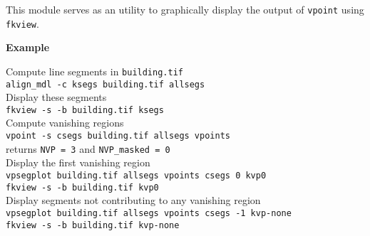 This module serves as an utility to graphically display the output of \verb+vpoint+ using \verb+fkview+.

{\large \bf Example}

\medskip

Compute line segments in \verb+building.tif+\\
\verb+align_mdl -c ksegs building.tif allsegs+\\
Display these segments\\
\verb+fkview -s -b building.tif ksegs+\\
Compute vanishing regions\\
\verb+vpoint -s csegs building.tif allsegs vpoints+\\
returns \verb+NVP = 3+ and \verb+NVP_masked = 0+\\
Display the first vanishing region\\
\verb+vpsegplot building.tif allsegs vpoints csegs 0 kvp0+\\
\verb+fkview -s -b building.tif kvp0+\\
Display segments not contributing to any vanishing region\\
\verb+vpsegplot building.tif allsegs vpoints csegs -1 kvp-none+\\
\verb+fkview -s -b building.tif kvp-none+\\

